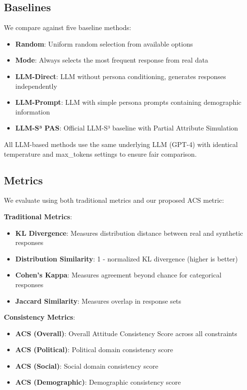 \documentclass[sigconf, anonymous]{acmart}
\begin{document}
\subsection{Baselines}

We compare against five baseline methods:

\begin{itemize}
    \item \textbf{Random}: Uniform random selection from available options
    \item \textbf{Mode}: Always selects the most frequent response from real data
    \item \textbf{LLM-Direct}: LLM without persona conditioning, generates responses independently
    \item \textbf{LLM-Prompt}: LLM with simple persona prompts containing demographic information
    \item \textbf{LLM-S³ PAS}: Official LLM-S³ baseline with Partial Attribute Simulation
\end{itemize}

All LLM-based methods use the same underlying LLM (GPT-4) with identical temperature and max_tokens settings to ensure fair comparison.

\subsection{Metrics}

We evaluate using both traditional metrics and our proposed ACS metric:

\textbf{Traditional Metrics}:
\begin{itemize}
    \item \textbf{KL Divergence}: Measures distribution distance between real and synthetic responses
    \item \textbf{Distribution Similarity}: 1 - normalized KL divergence (higher is better)
    \item \textbf{Cohen's Kappa}: Measures agreement beyond chance for categorical responses
    \item \textbf{Jaccard Similarity}: Measures overlap in response sets
\end{itemize}

\textbf{Consistency Metrics}:
\begin{itemize}
    \item \textbf{ACS (Overall)}: Overall Attitude Consistency Score across all constraints
    \item \textbf{ACS (Political)}: Political domain consistency score
    \item \textbf{ACS (Social)}: Social domain consistency score
    \item \textbf{ACS (Demographic)}: Demographic consistency score
\end{itemize}
\end{document}
